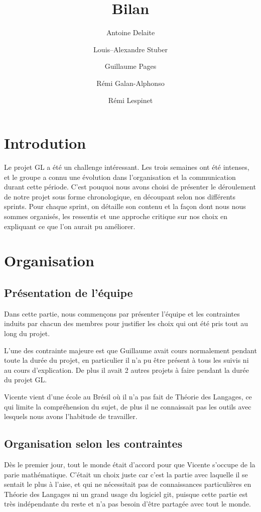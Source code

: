 \documentclass[a4paper, 12pt]{article}
\title{Bilan}
\author{Antoine Delaite \and Louis--Alexandre Stuber \and Guillaume Pages \and Rémi Galan-Alphonso \and Rémi Lespinet}
\date{}
\begin{document}
\maketitle

\section{Introdution}

Le projet GL a été un challenge intéressant. Les trois semaines
ont été intenses, et le groupe a connu une évolution dans
l'organisation et la communication durant cette période.  C'est
pouquoi nous avons choisi de présenter le déroulement de notre projet
sous forme chronologique, en découpant selon nos différents sprints.
Pour chaque sprint, on détaille son contenu et la façon dont nous nous
sommes organisés, les ressentis et une approche critique sur nos choix
en expliquant ce que l'on aurait pu améliorer.


\section{Organisation}

\subsection{Présentation de l'équipe}

Dans cette partie, nous commençons par présenter l'équipe et les contraintes
induits par chacun des membres pour justifier les choix qui ont été pris
tout au long du projet.

L'une des contrainte majeure est que Guillaume avait cours normalement
pendant toute la durée du projet, en particulier il n'a pu être
présent à tous les suivis ni au cours d'explication.  De plus il avait
2 autres projets à faire pendant la durée du projet GL.

Vicente vient d'une école au Brésil où il n'a pas fait de Théorie des Langages,
ce qui limite la compréhension du sujet, de plus il ne connaissait pas
les outils avec lesquels nous avons l'habitude de travailler.

\subsection{Organisation selon les contraintes}

Dès le premier jour, tout le monde était d'accord pour que Vicente s'occupe
de la parie mathématique. C'était un choix juste car c'est la partie
avec laquelle il se sentait le plus à l'aise, et qui ne nécessitait pas
de connaissances particulières en Théorie des Langages ni un grand usage
du logiciel git, puisque cette partie est très indépendante du reste
et n'a pas besoin d'être partagée avec tout le monde.
\end{document}
